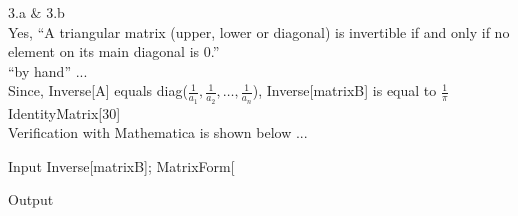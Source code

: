 \documentclass[11pt,a4paper]{article}
\begin{document}
3.a $\&$ 3.b\\
Yes, {``}A triangular matrix (upper, lower or diagonal) is invertible if and only if no element on its main diagonal is 0.{''}\\

{``}by hand{''} ...\\
Since, Inverse[A] equals diag($\frac{1}{a_1},\frac{1}{a_2},\ldots ,\frac{1}{a_n}$), Inverse[matrixB] is equal to $\frac{1}{\pi }$IdentityMatrix[30]\\

Verification with Mathematica is shown below ...

\begin{mmaCell}[moredefined={matrixB}]{Input}
Inverse[matrixB];
MatrixForm[%
\end{mmaCell}

\begin{mmaCell}{Output}

\end{mmaCell}
\end{document}
